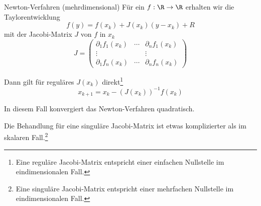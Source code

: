 \begin{defi}{Newton-Verfahren (mehrdimensional)}
    Für ein $f: \R \to \R$ erhalten wir die Taylorentwicklung 
    \[
        f(y) = f(x_k) + J(x_k) (y - x_k) + R
    \]
    mit der Jacobi-Matrix $J$ von $f$ in $x_k$
    \[
        J = \begin{pmatrix}
            \partial_1 f_1 (x_k) & \cdots & \partial_n f_1 (x_k)  \\ 
            \vdots               &        & \vdots                \\ 
            \partial_1 f_n (x_k) & \cdots & \partial_n f_n (x_k) 
        \end{pmatrix}
    \]
    
    Dann gilt für reguläres $J(x_k)$ direkt\footnote{Eine reguläre Jacobi-Matrix entspricht einer einfachen Nullstelle im eindimensionalen Fall.}
    \[
        x_{k+1} = x_k - \left( J(x_k) \right)^{-1} f(x_k)    
    \]
    
    In diesem Fall konvergiert das Newton-Verfahren quadratisch.
    
    Die Behandlung für eine singuläre Jacobi-Matrix ist etwas komplizierter als im skalaren Fall.\footnote{Eine singuläre Jacobi-Matrix entspricht einer mehrfachen Nullstelle im eindimensionalen Fall.}
\end{defi}
